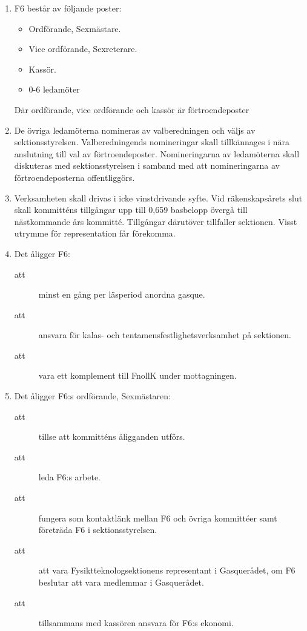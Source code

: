\documentclass[11pt,a4paper]{article}
\begin{document}
\begin{enumerate}[\thesubsection .1]

  \item F6 består av följande poster:
  
    \begin{itemize}
      \item Ordförande, Sexmästare.
      \item Vice ordförande, Sexreterare.
      \item Kassör.
      \item 0-6 ledamöter
    \end{itemize}
Där ordförande, vice ordförande och kassör är förtroendeposter


\item De övriga ledamöterna nomineras av valberedningen och väljs av sektionsstyrelsen. Valberedningends nomineringar skall tillkännages i nära anslutning till val av förtroendeposter. Nomineringarna av ledamöterna skall diskuteras med sektionsstyrelsen i samband med att nomineringarna av förtroendeposterna offentliggörs. 


  \item Verksamheten skall drivas i icke vinstdrivande syfte. Vid
  räkenskaps\-år\-ets slut skall kommitténs tillgångar upp till 0,659
  basbelopp övergå till nästkommande års kommitté. Tillgångar
  därutöver tillfaller sektionen. Visst utrymme för representation får
  förekomma.

  \item Det åligger F6:
    \begin{description}
      \item[att] minst en gång per läsperiod anordna gasque.
      \item[att] ansvara för kalas- och tentamensfestlighetsverksamhet på sektionen.
      \item[att] vara ett komplement till FnollK under mottagningen.
 
    \end{description}

  \item Det åligger F6:s ordförande, Sexmästaren:
    \begin{description}
      \item[att] tillse att kommitténs åligganden utförs.
      \item[att] leda F6:s arbete.
      \item[att] fungera som kontaktlänk mellan F6 och övriga kommittéer samt företräda F6 i sektionsstyrelsen.
      \item[att] att vara Fysiktteknologsektionens representant i
        Gasquerådet, om F6 beslutar att vara medlemmar i
        Gasquerådet.
      \item[att] tillsammans med kassören ansvara för F6:s ekonomi.
    \end{description}


\end{enumerate}
\end{document}
